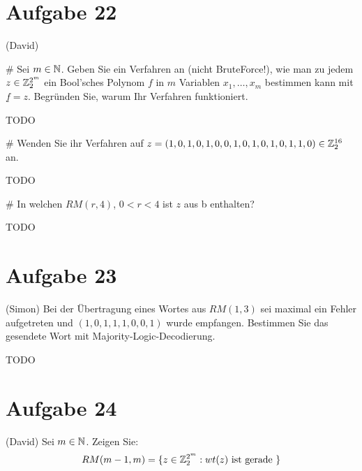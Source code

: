 
\setcounter{MaxMatrixCols}{20}

\section*{Aufgabe 22}
(David)
\begin{myList}
#
Sei $m \in \mathbb{N}$. Geben Sie ein Verfahren an (nicht BruteForce!), wie man zu jedem $z \in \mathbb{Z}^{2^m}_2$ ein Bool'sches Polynom $f$ in $m$ Variablen $x_1,\ldots,x_m$ bestimmen kann mit $\underline{f} = z$. Begründen Sie, warum Ihr Verfahren funktioniert.\medskip

TODO

#
Wenden Sie ihr Verfahren auf $z = (1,0,1,0,1,0,0,1,0,1,0,1,0,1,1,0) \in \mathbb{Z}^{16}_{2}$ an.\medskip

TODO

#
In welchen $RM(r,4)$, $0 < r < 4$ ist $z$ aus b enthalten?\medskip

TODO
\end{myList}

\section*{Aufgabe 23}
(Simon)
Bei der Übertragung eines Wortes aus $RM(1,3)$ sei maximal ein Fehler aufgetreten und $(1,0,1,1,1,0,0,1)$ wurde empfangen. Bestimmen Sie das gesendete Wort mit Majority-Logic-Decodierung.\medskip

TODO

\section*{Aufgabe 24}
(David)
Sei $m \in \mathbb{N}$. Zeigen Sie:
\begin{equation*}
	RM(m-1,m) = \lbrace z \in \mathbb{Z}^{2^m}_2 : wt(z) \text{ ist gerade } \rbrace
\end{equation*}

